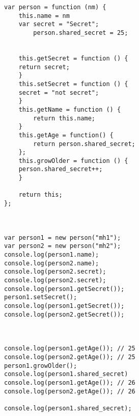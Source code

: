 \begin{verbatim}
var person = function (nm) {
	this.name = nm  
	var secret = "Secret";  
        person.shared_secret = 25; 
	
	
	this.getSecret = function () {
	return secret;
	}
	this.setSecret = function () {
	secret = "not secret";
	}
    this.getName = function () {
        return this.name;
    }
	this.getAge = function() {
		return person.shared_secret;
	};
	this.growOlder = function () {
	person.shared_secret++;
	}

    return this;
};



var person1 = new person("mh1");
var person2 = new person("mh2");
console.log(person1.name); 
console.log(person2.name); 
console.log(person2.secret); 
console.log(person2.secret); 
console.log(person1.getSecret());
person1.setSecret();
console.log(person1.getSecret());
console.log(person2.getSecret());



console.log(person1.getAge()); // 25
console.log(person2.getAge()); // 25
person1.growOlder();
console.log(person1.shared_secret)
console.log(person1.getAge()); // 26
console.log(person2.getAge()); // 26

console.log(person1.shared_secret);
\end{verbatim}

